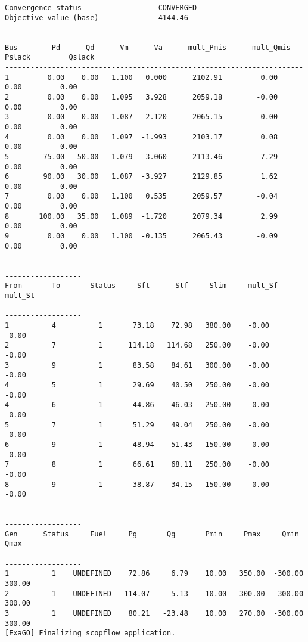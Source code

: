 \begin{lstlisting}
Convergence status                  CONVERGED
Objective value (base)              4144.46

----------------------------------------------------------------------
Bus        Pd      Qd      Vm      Va      mult_Pmis      mult_Qmis      Pslack         Qslack        
----------------------------------------------------------------------
1         0.00    0.00   1.100   0.000      2102.91         0.00         0.00         0.00
2         0.00    0.00   1.095   3.928      2059.18        -0.00         0.00         0.00
3         0.00    0.00   1.087   2.120      2065.15        -0.00         0.00         0.00
4         0.00    0.00   1.097  -1.993      2103.17         0.08         0.00         0.00
5        75.00   50.00   1.079  -3.060      2113.46         7.29         0.00         0.00
6        90.00   30.00   1.087  -3.927      2129.85         1.62         0.00         0.00
7         0.00    0.00   1.100   0.535      2059.57        -0.04         0.00         0.00
8       100.00   35.00   1.089  -1.720      2079.34         2.99         0.00         0.00
9         0.00    0.00   1.100  -0.135      2065.43        -0.09         0.00         0.00

----------------------------------------------------------------------------------------
From       To       Status     Sft      Stf     Slim     mult_Sf  mult_St 
----------------------------------------------------------------------------------------
1          4          1       73.18    72.98   380.00    -0.00    -0.00
2          7          1      114.18   114.68   250.00    -0.00    -0.00
3          9          1       83.58    84.61   300.00    -0.00    -0.00
4          5          1       29.69    40.50   250.00    -0.00    -0.00
4          6          1       44.86    46.03   250.00    -0.00    -0.00
5          7          1       51.29    49.04   250.00    -0.00    -0.00
6          9          1       48.94    51.43   150.00    -0.00    -0.00
7          8          1       66.61    68.11   250.00    -0.00    -0.00
8          9          1       38.87    34.15   150.00    -0.00    -0.00

----------------------------------------------------------------------------------------
Gen      Status     Fuel     Pg       Qg       Pmin     Pmax     Qmin     Qmax  
----------------------------------------------------------------------------------------
1          1    UNDEFINED    72.86     6.79    10.00   350.00  -300.00   300.00
2          1    UNDEFINED   114.07    -5.13    10.00   300.00  -300.00   300.00
3          1    UNDEFINED    80.21   -23.48    10.00   270.00  -300.00   300.00
[ExaGO] Finalizing scopflow application.
\end{lstlisting}

